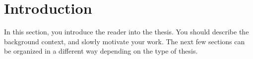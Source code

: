 \section{Introduction}
\label{sec:thesis_introduction}  %

In this section, you introduce the reader into the thesis. You should describe the background context, and slowly motivate your work.
The next few sections can be organized in a different way depending on the type of thesis.
